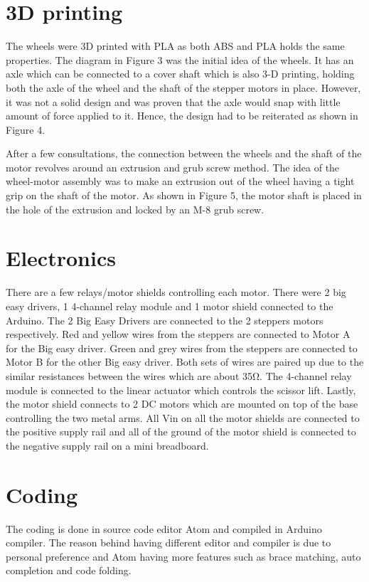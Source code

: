 \documentclass[12pt]{report}
\begin{document}
\section{3D printing}
The wheels were 3D printed with PLA as both ABS and PLA holds the same properties. The diagram in Figure 3 was the initial idea of the wheels. It has an axle which can be connected to a cover shaft which is also 3-D printing, holding both the axle of the wheel and the shaft of the stepper motors in place. However, it was not a solid design and was proven that the axle would snap with little amount of force applied to it. Hence, the design had to be reiterated as shown in Figure 4.

After a few consultations, the connection between the wheels and the shaft of the motor revolves around an extrusion and grub screw method. The idea of the wheel-motor assembly was to make an extrusion out of the wheel having a tight grip on the shaft of the motor. As shown in Figure 5, the motor shaft is placed in the hole of the extrusion and locked by an M-8 grub screw. 

\section{Electronics}
There are a few relays/motor shields controlling each motor. There were 2 big easy drivers, 1 4-channel relay module and 1 motor shield connected to the Arduino. The 2 Big Easy Drivers are connected to the 2 steppers motors respectively. Red and yellow wires from the steppers are connected to Motor A for the Big easy driver. Green and grey wires from the steppers are connected to Motor B for the other Big easy driver. Both sets of wires are paired up due to the similar resistances between the wires which are about 35Ω.  The 4-channel relay module is connected to the linear actuator which controls the scissor lift. Lastly, the motor shield connects to 2 DC motors which are mounted on top of the base controlling the two metal arms. All Vin on all the motor shields are connected to the positive supply rail and all of the ground of the motor shield is connected to the negative supply rail on a mini breadboard.

\section{Coding}
The coding is done in source code editor Atom and compiled in Arduino compiler. The reason behind having different editor and compiler is due to personal preference and Atom having more features such as brace matching, auto completion and code folding.
\end{document}
